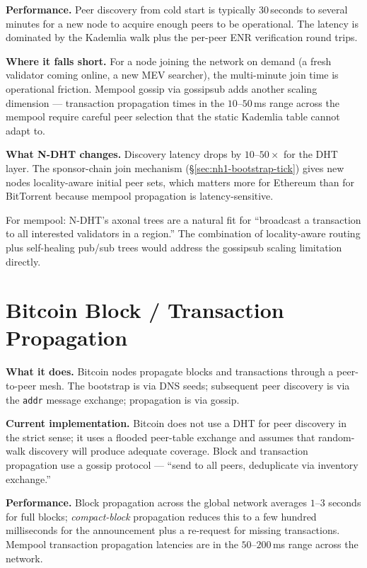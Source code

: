\documentclass[twoside,nobib]{tufte-book}
\newcommand{\NDHT}{N-DHT\xspace}
\begin{document}
\textbf{Performance.} Peer discovery from cold start is
typically $30$\,seconds to several minutes for a new node to
acquire enough peers to be operational. The latency is
dominated by the Kademlia walk plus the per-peer ENR
verification round trips.

\textbf{Where it falls short.} For a node joining the network
on demand (a fresh validator coming online, a new MEV searcher),
the multi-minute join time is operational friction. Mempool
gossip via gossipsub adds another scaling dimension --- transaction
propagation times in the $10$--$50$\,ms range across the
mempool require careful peer selection that the static
Kademlia table cannot adapt to.

\textbf{What \NDHT changes.} Discovery latency drops by
$10$--$50\times$ for the DHT layer. The sponsor-chain join
mechanism (\S\ref{sec:nh1-bootstrap-tick}) gives new nodes
locality-aware initial peer sets, which matters more for
Ethereum than for BitTorrent because mempool propagation is
latency-sensitive.

For mempool: \NDHT's axonal trees are a natural fit for
``broadcast a transaction to all interested validators in a
region.'' The combination of locality-aware routing plus
self-healing pub/sub trees would address the gossipsub scaling
limitation directly.

\section{Bitcoin Block / Transaction Propagation}

\textbf{What it does.} Bitcoin nodes propagate blocks and
transactions through a peer-to-peer mesh. The bootstrap is via
DNS seeds; subsequent peer discovery is via the
\texttt{addr} message exchange; propagation is via gossip.

\textbf{Current implementation.} Bitcoin does not use a DHT for
peer discovery in the strict sense; it uses a flooded peer-table
exchange and assumes that random-walk discovery will produce
adequate coverage. Block and transaction propagation use a
gossip protocol --- ``send to all peers, deduplicate via
inventory exchange.''

\textbf{Performance.} Block propagation across the global
network averages $1$--$3$ seconds for full blocks;
\emph{compact-block} propagation reduces this to a few hundred
milliseconds for the announcement plus a re-request for missing
transactions. Mempool transaction propagation latencies are in
the $50$--$200$\,ms range across the network.
\end{document}
